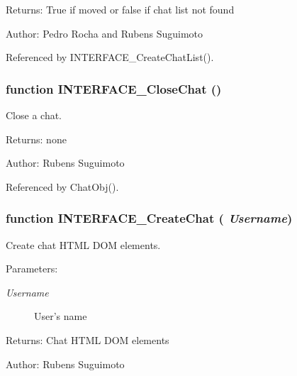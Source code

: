 \begin{Desc}
\item[Returns:]True if moved or false if chat list not found \end{Desc}
\begin{Desc}
\item[Author:]Pedro Rocha and Rubens Suguimoto \end{Desc}


Referenced by INTERFACE\_\-CreateChatList().
\subsubsection[INTERFACE\_\-CloseChat]{\setlength{\rightskip}{0pt plus 5cm}function INTERFACE\_\-CloseChat ()}\label{interface_2chat_8js_f42304a59b57c07635decbe2767d7357}


Close a chat. 

\begin{Desc}
\item[Returns:]none \end{Desc}
\begin{Desc}
\item[Author:]Rubens Suguimoto \end{Desc}


Referenced by ChatObj().
\subsubsection[INTERFACE\_\-CreateChat]{\setlength{\rightskip}{0pt plus 5cm}function INTERFACE\_\-CreateChat ( {\em Username})}\label{interface_2chat_8js_7db320971857984f9b783bff9d92cccf}


Create chat HTML DOM elements. 

\begin{Desc}
\item[Parameters:]
\begin{description}
\item[{\em Username}]User's name \end{description}
\end{Desc}
\begin{Desc}
\item[Returns:]Chat HTML DOM elements \end{Desc}
\begin{Desc}
\item[Author:]Rubens Suguimoto \end{Desc}


